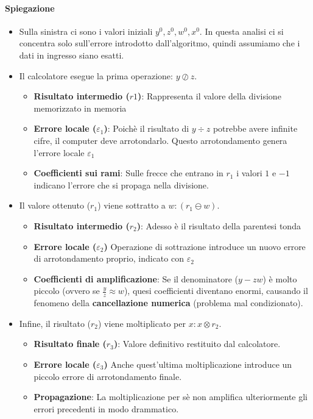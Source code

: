 \documentclass[a4paper,12pt]{article}
\begin{document}
	\paragraph{Spiegazione}
	\begin{itemize}
		\item 
		Sulla sinistra ci sono i valori iniziali $y^0, z^0, w^0, x^0$. In questa analisi ci si concentra solo sull'errore introdotto dall'algoritmo, quindi assumiamo che i dati in ingresso siano esatti.
		\item Il calcolatore esegue la prima operazione: $y \oslash z$.
		\begin{itemize} 
			\item \textbf{Risultato intermedio ($r1$)}: Rappresenta il valore della divisione memorizzato in memoria
			\item \textbf{Errore locale ($\varepsilon_1$)}: Poichè il risultato di $y\div{z}$ potrebbe avere infinite cifre, il computer deve arrotondarlo. Questo arrotondamento genera l'errore locale $\varepsilon_1$
			\item \textbf{Coefficienti sui rami}: Sulle frecce che entrano in $r_1$ i valori $1$ e $-1$ indicano l'errore che si propaga nella divisione.
		\end{itemize}
		\item Il valore ottenuto ($r_1$) viene sottratto a $w: (r_1 \ominus w)$.
		\begin{itemize}
			\item \textbf{Risultato intermedio ($r_2$)}: Adesso è il risultato della parentesi tonda
			\item \textbf{Errore locale ($\varepsilon_2$)} Operazione di sottrazione introduce un nuovo errore di arrotondamento proprio, indicato con $\varepsilon_2$
			\item \textbf{Coefficienti di amplificazione}: Se il denominatore ($y-zw$) è molto piccolo (ovvero se $\frac{y}{z} \approx w$), quesi coefficienti diventano enormi, causando il fenomeno della \textbf{cancellazione numerica} (problema mal condizionato).
		\end{itemize}
		\item Infine, il risultato ($r_2$) viene moltiplicato per $x: x \otimes r_2$.
		\begin{itemize}
			\item \textbf{Risultato finale ($r_3$)}: Valore definitivo restituito dal calcolatore.
			\item \textbf{Errore locale ($\varepsilon_3$)} Anche quest'ultima moltiplicazione introduce un piccolo errore di arrotondamento finale.
			\item \textbf{Propagazione}: La moltiplicazione per sè non amplifica ulteriormente gli errori precedenti in modo drammatico.
		\end{itemize}
	\end{itemize}
	
\end{document}
